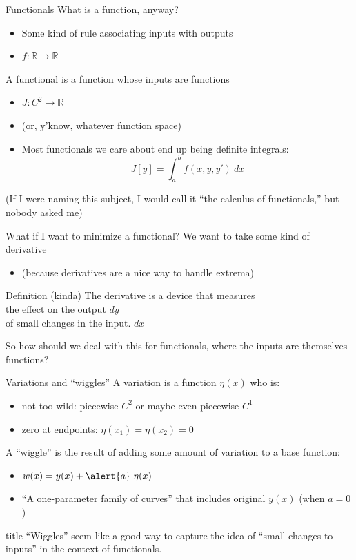 \documentclass[handout]{beamer}
\newcommand{\RR}{\mathbb{R}}
\begin{document}
\begin{frame}{Functionals}
What is a function, anyway? \pause
\begin{itemize}
    \item Some kind of rule associating inputs with outputs \pause
    \item $f:\RR \to \RR$ \pause
\end{itemize}
A \alert{functional} is a function whose \alert{inputs} are functions \pause
\begin{itemize}
    \item $J: C^2 \to \RR$ \pause
    \item (or, y'know, whatever function space) \pause
    \item Most functionals we care about end up being definite integrals: 
    \[J[y] = \int_a^b f(x, y, y')\ dx\] \pause
\end{itemize}
(If I were naming this subject, I would call it ``the calculus of \alert{functionals},'' but nobody asked me)
\end{frame}

\begin{frame}{What if I want to minimize a functional?}
We want to take some kind of derivative\pause
\begin{itemize}
    \item (because derivatives are a nice way to handle extrema) \pause
\end{itemize}
\begin{block}{Definition (kinda)}
The \alert{derivative} is a device that measures \\
the effect on the output \hfill $dy$ \\
of small changes in the input. \hfill $dx$
\end{block} \pause
So how should we deal with this for functionals, where the inputs are themselves functions?

\end{frame}

\begin{frame}{Variations and ``wiggles''}
A \alert{variation} is a function $\eta(x)$ who is: \pause
\begin{itemize}
    \item \alert{not too wild}: piecewise $C^2$ or maybe even piecewise $C^1$ \pause
    \item \alert{zero at endpoints}: $\eta(x_1) = \eta(x_2) = 0$ \pause
\end{itemize}
A \alert{``wiggle''} is the result of adding some \alert{a}mount of variation to a base function: \pause
\begin{itemize}
    \item $w(x) = y(x) + \alert{a}\ \eta(x)$ \pause
    \item ``A one-parameter family of curves'' that includes original $y(x)$ (when $a=0$)
\end{itemize}\pause
\begin{beamercolorbox}[sep=4pt,shadow=true,rounded=true]{title}
    ``Wiggles'' seem like a good way to capture the idea of ``small changes to inputs'' in the context of functionals.
\end{beamercolorbox}

\end{frame}
\end{document}
